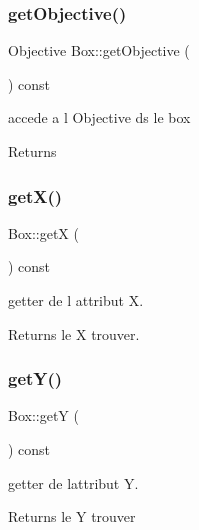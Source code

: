 \subsubsection{\texorpdfstring{get\+Objective()}{getObjective()}}
{\footnotesize\ttfamily Objective Box\+::get\+Objective (\begin{DoxyParamCaption}{ }\end{DoxyParamCaption}) const\hspace{0.3cm}{\ttfamily [inline]}}



accede a l Objective ds le box 

\begin{DoxyReturn}{Returns}

\end{DoxyReturn}
\mbox{\label{class_box_a253cf157c61db2ca9222d29324387b22}} 
\subsubsection{\texorpdfstring{get\+X()}{getX()}}
{\footnotesize\ttfamily Box\+::getX (\begin{DoxyParamCaption}{ }\end{DoxyParamCaption}) const\hspace{0.3cm}{\ttfamily [inline]}}



getter de l attribut X. 

\begin{DoxyReturn}{Returns}
le X trouver. 
\end{DoxyReturn}
\mbox{\label{class_box_a642cd5e8f8d52529f23df56b9e8acb87}} 
\subsubsection{\texorpdfstring{get\+Y()}{getY()}}
{\footnotesize\ttfamily Box\+::getY (\begin{DoxyParamCaption}{ }\end{DoxyParamCaption}) const\hspace{0.3cm}{\ttfamily [inline]}}



getter de l\textquotesingle{}attribut Y. 

\begin{DoxyReturn}{Returns}
le Y trouver 
\end{DoxyReturn}
\mbox{\label{class_box_addada4538ebe16ffd8bef3bb6bf2c83d}} 
